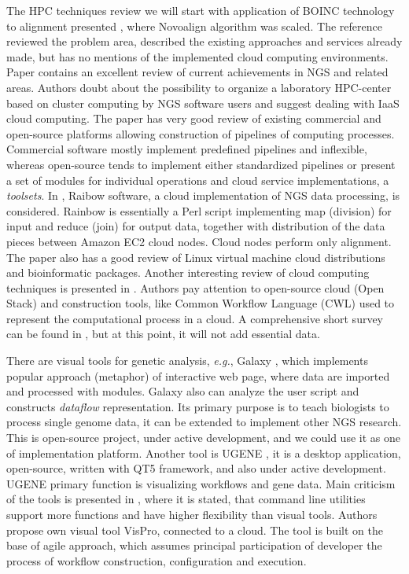 \documentclass[a4paper]{jpconf}
\begin{document}
The HPC techniques review we will start with application of BOINC technology to alignment presented \cite{boinc10}, where Novoalign algorithm was scaled.
The reference \cite{guo16} reviewed the problem area, described the existing approaches and services already made, but has no mentions of the implemented cloud computing environments.
%
Paper \cite{kwon15} contains an excellent review of current achievements in NGS and related areas. Authors doubt about the possibility to organize a laboratory HPC-center based on cluster computing by NGS software users and suggest dealing with IaaS cloud computing. The paper has very good review of existing commercial and open-source platforms allowing construction of pipelines of computing processes. Commercial software mostly implement predefined pipelines and inflexible, whereas open-source tends to implement either standardized pipelines or present a set of modules for individual operations and cloud service implementations, a \emph{toolsets}.
%
In \cite{zhao17}, Raibow software, a cloud implementation of NGS data processing, is considered. Rainbow is essentially a Perl script implementing map (division) for input and reduce (join) for output data, together with distribution of the data pieces between Amazon EC2 cloud nodes. Cloud nodes perform only alignment. The paper also has a good review of Linux virtual machine cloud distributions and bioinformatic packages.
Another interesting review of cloud computing techniques is presented in \cite{lang18}. Authors pay attention to open-source cloud (Open Stack) and construction tools, like Common Workflow Language (CWL) \cite{cwl} used to represent the computational process in a cloud.
A comprehensive short survey can be found in \cite{baker18}, but at this point, it will not add essential data.

There are visual tools for genetic analysis, \emph{e.g.}, Galaxy \cite{galaxy18}, which implements popular approach (metaphor) of interactive web page, where data are imported and processed with modules. Galaxy also can analyze the user script and constructs \emph{dataflow} representation. Its primary purpose is to teach biologists to process single genome data, it can be extended to implement other NGS research. This is open-source project, under active development, and we could use it as one of implementation platform. Another tool is UGENE \cite{ugene18}, it is a desktop application, open-source, written with QT5 framework, and also under active development. UGENE primary function is visualizing workflows and gene data. Main criticism of the tools is presented in \cite{mill16}, where it is stated, that command line utilities support more functions and have higher flexibility than visual tools. Authors propose own visual tool VisPro, connected to a cloud. The tool is built on the base of agile approach, which assumes principal participation of developer the process of workflow construction, configuration and execution.
\end{document}
